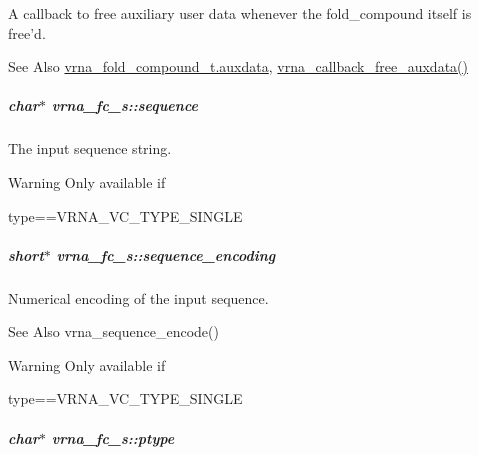 A callback to free auxiliary user data whenever the fold\-\_\-compound itself is free'd. 

\begin{DoxySeeAlso}{See Also}
\hyperlink{group__fold__compound_a20048e0c369e9f24b55423d600037c68}{vrna\-\_\-fold\-\_\-compound\-\_\-t.\-auxdata}, \hyperlink{group__fold__compound_ga75aaf7b809290de808e545877a9e20f7}{vrna\-\_\-callback\-\_\-free\-\_\-auxdata()} 
\end{DoxySeeAlso}
\hypertarget{group__fold__compound_a87f6abcda89cfb7a486c97e1f5371525}{
\subparagraph[{sequence}]{\setlength{\rightskip}{0pt plus 5cm}char$\ast$ vrna\-\_\-fc\-\_\-s\-::sequence}}\label{group__fold__compound_a87f6abcda89cfb7a486c97e1f5371525}


The input sequence string. 

\begin{DoxyWarning}{Warning}
Only available if\begin{DoxyVerb}type==VRNA_VC_TYPE_SINGLE \end{DoxyVerb}
 
\end{DoxyWarning}
\hypertarget{group__fold__compound_a9934bdb695d35a3544285cbcc19f9763}{
\subparagraph[{sequence\-\_\-encoding}]{\setlength{\rightskip}{0pt plus 5cm}short$\ast$ vrna\-\_\-fc\-\_\-s\-::sequence\-\_\-encoding}}\label{group__fold__compound_a9934bdb695d35a3544285cbcc19f9763}


Numerical encoding of the input sequence. 

\begin{DoxySeeAlso}{See Also}
vrna\-\_\-sequence\-\_\-encode() 
\end{DoxySeeAlso}
\begin{DoxyWarning}{Warning}
Only available if\begin{DoxyVerb}type==VRNA_VC_TYPE_SINGLE \end{DoxyVerb}
 
\end{DoxyWarning}
\hypertarget{group__fold__compound_a3fbea559f1d1976b2d67c215cdeee0b2}{
\subparagraph[{ptype}]{\setlength{\rightskip}{0pt plus 5cm}char$\ast$ vrna\-\_\-fc\-\_\-s\-::ptype}}\label{group__fold__compound_a3fbea559f1d1976b2d67c215cdeee0b2}


